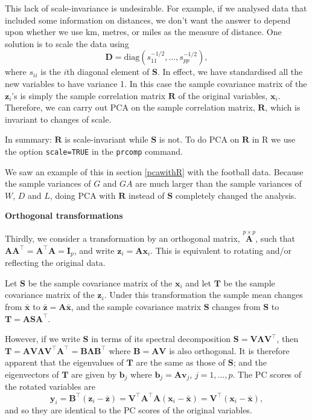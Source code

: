 \documentclass[
]{book}
\theoremstyle{definition}
\theoremstyle{definition}
\theoremstyle{definition}
\theoremstyle{definition}
\theoremstyle{remark}
\begin{document}
This lack of scale-invariance is undesirable. For example, if we analysed data that included some information on distances, we don't want the answer to depend upon whether we use km, metres, or miles as the measure of distance.
One solution is to scale the data using
\[
\mathbf D= \text{diag}(s_{11}^{-1/2}, \ldots , s_{pp}^{-1/2}),
 \]
where \(s_{ii}\) is the \(i\)th diagonal element of \(\mathbf S\). In effect, we have standardised all the new variables to have variance 1. In this case the sample covariance matrix of the \(\mathbf z_i\)'s is simply the sample correlation matrix \(\mathbf R\) of the original variables, \(\mathbf x_i\). Therefore, we can carry out PCA on the sample correlation matrix, \(\mathbf R\), which is invariant to changes of scale.

In summary: \(\mathbf R\) is scale-invariant while \(\mathbf S\) is not. To do PCA on \(\mathbf R\) in R we use the option \texttt{scale=TRUE} in the \texttt{prcomp} command.

We saw an example of this in section \ref{pcawithR} with the football data. Because the sample
variances of \(G\) and \(GA\) are much larger than the sample variances of \(W\), \(D\) and \(L\), doing PCA with \(\mathbf R\) instead of \(\mathbf S\) completely changed the analysis.

\textbf{Orthogonal transformations}

Thirdly, we consider a transformation by an orthogonal matrix, \(\stackrel{p \times p}{\mathbf A}\), such that \(\mathbf A\mathbf A^\top = \mathbf A^\top \mathbf A= \mathbf I_p\), and write \(\mathbf z_i = \mathbf A\mathbf x_i\). This is equivalent to rotating and/or reflecting the original data.

Let \(\mathbf S\) be the sample covariance matrix of the \(\mathbf x_i\) and let \(\mathbf T\) be the sample covariance matrix of the \(\mathbf z_i\). Under this transformation the sample mean changes from \(\bar{\mathbf x}\) to \(\bar{\mathbf z} = \mathbf A\bar{\mathbf x}\), and the sample covariance matrix \(\mathbf S\) changes from \(\mathbf S\) to \(\mathbf T= \mathbf A\mathbf S\mathbf A^\top\).

However, if we write \(\mathbf S\) in terms of its spectral decomposition \(\mathbf S= \mathbf V\boldsymbol \Lambda\mathbf V^\top\), then \(\mathbf T= \mathbf A\mathbf V\boldsymbol \Lambda\mathbf V^\top \mathbf A^\top = \mathbf B\boldsymbol \Lambda\mathbf B^\top\) where \(\mathbf B= \mathbf A\mathbf V\) is also orthogonal. It is therefore apparent that the eigenvalues of \(\mathbf T\) are the same as those of \(\mathbf S\); and the eigenvectors of \(\mathbf T\) are given by \(\mathbf b_j\) where \(\mathbf b_j = \mathbf A\mathbf v_j\), \(j=1,\ldots,p\). The PC scores of the rotated variables are
\[ \mathbf y_i = \mathbf B^\top (\mathbf z_i - \bar{\mathbf z}) = \mathbf V^\top \mathbf A^\top \mathbf A(\mathbf x_i - \bar{\mathbf x}) = \mathbf V^\top (\mathbf x_i - \bar{\mathbf x}),\]
and so they are identical to the PC scores of the original variables.
\end{document}
